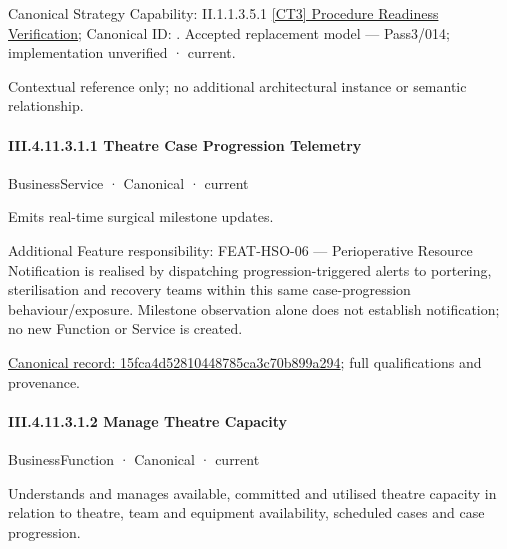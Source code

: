 {\small Canonical Strategy Capability: II.1.1.3.5.1 \hyperref[element:1ba44ca495b74b6fb3a607c39c6672e6]{[CT3] Procedure Readiness Verification}; Canonical ID: \texttt{}. Accepted replacement model — Pass3/014; implementation unverified · current.}\par
Contextual reference only; no additional architectural instance or semantic relationship.\par
\paragraph*{III.4.11.3.1.1 Theatre Case Progression Telemetry}
\label{navigation:III.4.11.3.1.1}

\label{element:15fca4d52810448785ca3c70b899a294}
{\small BusinessService · Canonical · current}\par

Emits real-time surgical milestone updates.



Additional Feature responsibility: FEAT-HSO-06 — Perioperative Resource Notification is realised by dispatching progression-triggered alerts to portering, sterilisation and recovery teams within this same case-progression behaviour/exposure. Milestone observation alone does not establish notification; no new Function or Service is created.


{\footnotesize \href{../../../../../../../../continuum/business/business-service/15fca4d52810448785ca3c70b899a294.md}{Canonical record: 15fca4d52810448785ca3c70b899a294}; full qualifications and provenance.}\par
\paragraph*{III.4.11.3.1.2 Manage Theatre Capacity}
\label{navigation:III.4.11.3.1.2}

\label{element:3566d549770f490dba823fe3b0421446}
{\small BusinessFunction · Canonical · current}\par

Understands and manages available, committed and utilised theatre capacity in relation to theatre, team and equipment availability, scheduled cases and case progression.



